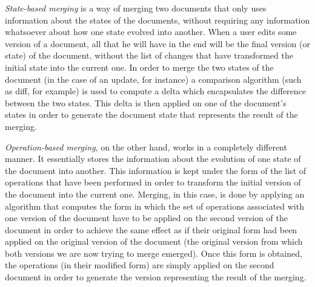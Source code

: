 \emph{State-based merging} is a way of merging two documents that only uses information
about the states of the documents, without requiring any information whatsoever about how
one state evolved into another. When a user edits some version of a document, all that he
will have in the end will be the final version (or state) of the document, without the list
of changes that have transformed the initial state into the current one. In order to merge
the two states of the document (in the case of an update, for instance) a comparison
algorithm (such as diff, for example) is used to compute a delta which encapsulates the difference
between the two states. This delta is then applied on one of the document's states
in order to generate the document state that represents the result of the merging. 

\emph{Operation-based merging}, on the other hand, works in a completely different manner.
It essentially stores the information about the evolution of one state of the document into another.
This information is kept under the form of the list of operations that have been performed
in order to transform the initial version of the document into the current one. Merging,
in this case, is done by applying an algorithm that computes the form in which the set
of operations associated with one version of the document have to be applied on the second
version of the document in order to achieve the same effect as if their original form
had been applied on the original version of the document (the original version from which
both versions we are now trying to merge emerged). Once this form is obtained, the operations
(in their modified form) are simply applied on the second document in order to generate
the version representing the result of the merging.

